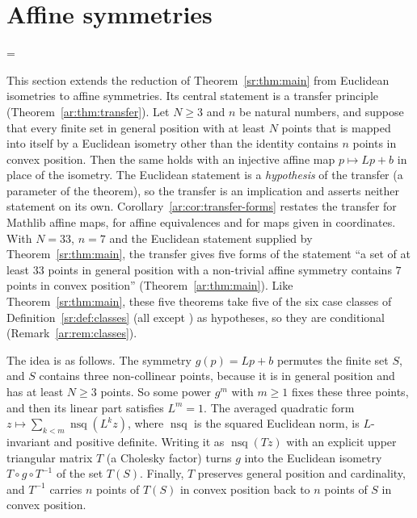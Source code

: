 \section{Affine symmetries}\label{ar:sec}
\begingroup\sloppy\emergencystretch=\linewidth

This section extends the reduction of Theorem~\ref{sr:thm:main} from Euclidean isometries to affine symmetries. Its
central statement is a transfer principle (Theorem~\ref{ar:thm:transfer}). Let $N\ge3$ and $n$ be natural numbers, and
suppose that every finite set in general position with at least $N$ points that is mapped into itself by a Euclidean
isometry other than the identity contains $n$ points in convex position. Then the same holds with an injective affine
map $p\mapsto Lp+b$ in place of the isometry. The Euclidean statement is a \emph{hypothesis} of the transfer (a
parameter of the theorem), so the transfer is an implication and asserts neither statement on its own.
Corollary~\ref{ar:cor:transfer-forms} restates the transfer for Mathlib affine maps, for affine equivalences and for
maps given in coordinates. With $N=33$, $n=7$ and the Euclidean statement supplied by Theorem~\ref{sr:thm:main}, the
transfer gives five forms of the statement ``a set of at least $33$ points in general
position with a non-trivial affine symmetry contains $7$ points in convex position'' (Theorem~\ref{ar:thm:main}). Like
Theorem~\ref{sr:thm:main}, these five theorems take five of the six case classes of Definition~\ref{sr:def:classes}
(all except ) as hypotheses, so they are conditional (Remark~\ref{ar:rem:classes}).

The idea is as follows. The symmetry $g(p)=Lp+b$ permutes the finite set $S$, and $S$ contains three non-collinear
points, because it is in general position and has at least $N\ge3$ points. So some power $g^m$ with $m\ge1$ fixes these
three points, and then its linear part satisfies $L^m=1$. The averaged quadratic form $z\mapsto\sum_{k<m}\operatorname{nsq}(L^kz)$, where $\operatorname{nsq}$ is the squared
Euclidean norm, is $L$-invariant and positive definite. Writing it as $\operatorname{nsq}(Tz)$ with an explicit upper
triangular matrix $T$ (a Cholesky factor) turns $g$ into the Euclidean isometry $T\circ g\circ T^{-1}$ of the set
$T(S)$. Finally, $T$ preserves general position and cardinality, and $T^{-1}$ carries $n$ points of $T(S)$ in convex
position back to $n$ points of $S$ in convex position.

